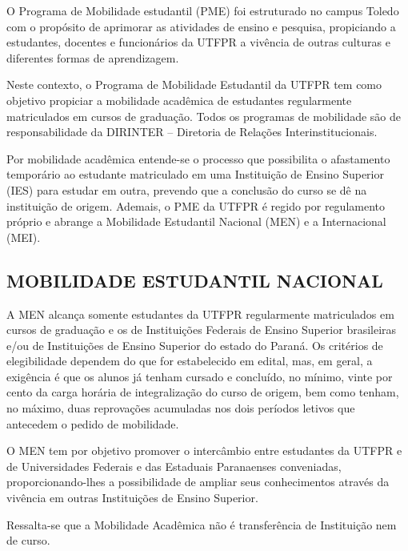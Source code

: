 O Programa de Mobilidade estudantil (PME) foi estruturado no campus Toledo com o propósito de aprimorar as atividades de ensino e pesquisa, propiciando a estudantes, docentes e funcionários da UTFPR a vivência de outras culturas e diferentes formas de aprendizagem.

Neste contexto, o Programa de Mobilidade Estudantil da UTFPR tem como objetivo propiciar a mobilidade acadêmica de estudantes regularmente matriculados em cursos de graduação. Todos os programas de mobilidade são de responsabilidade da DIRINTER – Diretoria de Relações Interinstitucionais.


Por mobilidade acadêmica entende-se o processo que possibilita o afastamento temporário ao estudante matriculado em uma Instituição de Ensino Superior (IES) para estudar em outra, prevendo que a conclusão do curso se dê na instituição de origem. Ademais, o PME da UTFPR é regido por regulamento próprio e abrange a Mobilidade Estudantil Nacional (MEN) e a Internacional (MEI).


\subsection{MOBILIDADE ESTUDANTIL NACIONAL}

A MEN alcança somente estudantes da UTFPR regularmente matriculados em cursos de graduação e os de Instituições Federais de Ensino Superior brasileiras e/ou de Instituições de Ensino Superior do estado do Paraná. Os critérios de elegibilidade dependem do que for estabelecido em edital, mas, em geral, a exigência é que os alunos já tenham cursado e concluído, no mínimo, vinte por cento da carga horária de integralização do curso de origem, bem como tenham, no máximo, duas reprovações acumuladas nos dois períodos letivos que antecedem o pedido de mobilidade.
 
O MEN tem por objetivo promover o intercâmbio entre estudantes da UTFPR e de Universidades Federais e das Estaduais Paranaenses conveniadas, proporcionando-lhes a possibilidade de ampliar seus conhecimentos através da vivência em outras Instituições de Ensino Superior.

Ressalta-se que a Mobilidade Acadêmica não é transferência de Instituição nem de curso.

